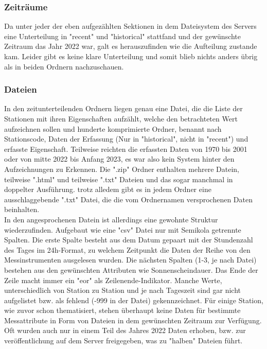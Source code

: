 \documentclass[letterpaper]{article} %
\begin{document}
            \subsubsection*{Zeiträume}
                Da unter jeder der eben aufgezählten Sektionen in dem Dateisystem des Servers eine Unterteilung in "recent" und "historical" stattfand und der gewünschte Zeitraum das Jahr 2022 war, galt es herauszufinden wie die Aufteilung zustande kam. Leider gibt es keine klare Unterteilung und somit blieb nichts anders übrig als in beiden Ordnern nachzuschauen.
            \subsubsection*{Dateien}
                In den zeitunterteilenden Ordnern liegen genau eine Datei, die die Liste der Stationen mit ihren Eigenschaften aufzählt, welche den betrachteten Wert aufzeichnen sollen und hunderte komprimierte Ordner, benannt nach Stationscode, Daten der Erfassung (Nur in "historical", nicht in "recent") und erfasste Eigenschaft. Teilweise reichten die erfassten Daten von 1970 bis 2001 oder von mitte 2022 bis Anfang 2023, es war also kein System hinter den Aufzeichnungen zu Erkennen.
                Die ".zip" Ordner enthalten mehrere Datein, teilweise ".html" und teilweise ".txt" Dateien und das sogar manchmal in doppelter Ausführung. trotz alledem gibt es in jedem Ordner eine ausschlaggebende ".txt" Datei, die die vom Ordnernamen versprochenen Daten beinhalten.
        \\
        
        In den angesprochenen Datein ist allerdings eine gewohnte Struktur wiederzufinden. Aufgebaut wie eine "csv" Datei nur mit Semikola getrennte Spalten. Die erste Spalte besteht aus dem Datum gepaart mit der Stundenzahl des Tages im 24h-Format, zu welchem Zeitpunkt die Daten der Reihe von den Messinstrumenten ausgelesen wurden. Die nächsten Spalten (1-3, je nach Datei) bestehen aus den gewünschten Attributen wie Sonnenscheindauer. Das Ende der Zeile macht immer ein "eor" als Zeilenende-Indikator.
        Manche Werte, unterschiedlich von Station zu Station und je nach Tageszeit sind gar nicht aufgelistet bzw. als fehlend (-999 in der Datei) gekennzeichnet. Für einige Station, wie zuvor schon thematisiert, stehen überhaupt keine Daten für bestimmte Messattribute in Form von Dateien in dem gewünschten Zeitraum zur Verfügung.
        Oft wurden auch nur in einem Teil des Jahres 2022 Daten erhoben, bzw. zur veröffentlichung auf dem Server freigegeben, was zu "halben" Dateien führt.
\end{document}
